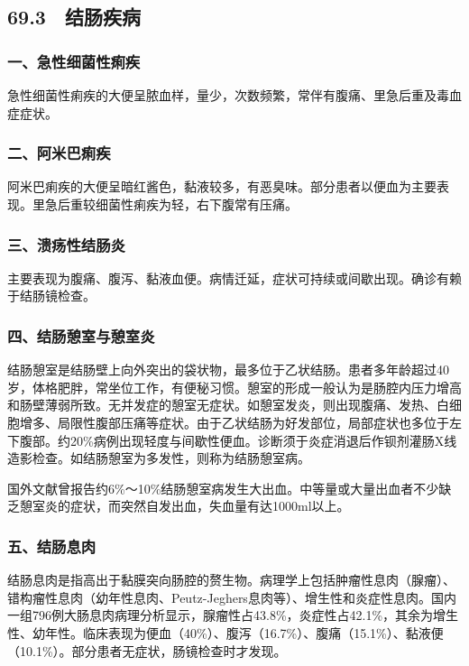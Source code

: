 \protect\hypertarget{text00176.html}{}{}

\subsection{69.3　结肠疾病}

\subsubsection{一、急性细菌性痢疾}

急性细菌性痢疾的大便呈脓血样，量少，次数频繁，常伴有腹痛、里急后重及毒血症症状。

\subsubsection{二、阿米巴痢疾}

阿米巴痢疾的大便呈暗红酱色，黏液较多，有恶臭味。部分患者以便血为主要表现。里急后重较细菌性痢疾为轻，右下腹常有压痛。

\subsubsection{三、溃疡性结肠炎}

主要表现为腹痛、腹泻、黏液血便。病情迁延，症状可持续或间歇出现。确诊有赖于结肠镜检查。

\subsubsection{四、结肠憩室与憩室炎}

结肠憩室是结肠壁上向外突出的袋状物，最多位于乙状结肠。患者多年龄超过40岁，体格肥胖，常坐位工作，有便秘习惯。憩室的形成一般认为是肠腔内压力增高和肠壁薄弱所致。无并发症的憩室无症状。如憩室发炎，则出现腹痛、发热、白细胞增多、局限性腹部压痛等症状。由于乙状结肠为好发部位，局部症状也多位于左下腹部。约20\%病例出现轻度与间歇性便血。诊断须于炎症消退后作钡剂灌肠X线造影检查。如结肠憩室为多发性，则称为结肠憩室病。

国外文献曾报告约6\%～10\%结肠憩室病发生大出血。中等量或大量出血者不少缺乏憩室炎的症状，而突然自发出血，失血量有达1000ml以上。

\subsubsection{五、结肠息肉}

结肠息肉是指高出于黏膜突向肠腔的赘生物。病理学上包括肿瘤性息肉（腺瘤）、错构瘤性息肉（幼年性息肉、Peutz-Jeghers息肉等）、增生性和炎症性息肉。国内一组796例大肠息肉病理分析显示，腺瘤性占43.8\%，炎症性占42.1\%，其余为增生性、幼年性。临床表现为便血（40\%）、腹泻（16.7\%）、腹痛（15.1\%）、黏液便（10.1\%）。部分患者无症状，肠镜检查时才发现。

